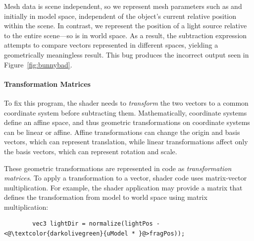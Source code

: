 \documentclass[../main.tex]{subfiles}
\begin{document}
	Mesh data is scene independent, so we represent mesh parameters such as  and  initially in model space, independent of the object's current relative position within the scene.
	In contrast, we represent the position of a light source relative to the entire scene---so  is in world space.
	As a result, the subtraction expression  attempts to compare vectors represented in different spaces, yielding a geometrically meaningless result.
	This bug produces the incorrect output seen in Figure~\ref{fig:bunnybad}.
	
	\paragraph {Transformation Matrices} To fix this program, the shader needs to \emph{transform} the two vectors to a common coordinate system before subtracting them. 
	Mathematically, coordinate systems define an affine space, and thus geometric transformations on coordinate systems can be linear or affine.
	Affine transformations can change the origin and basis vectors, which can represent translation, while linear transformations affect only the basis vectors, which can represent rotation and scale. 
	
	These geometric transformations are represented in code as \emph{transformation matrices}.
	To apply a transformation to a vector, shader code uses matrix-vector multiplication. 
	For example, the shader application may provide a matrix  that defines the transformation from model to world space using matrix multiplication:
	\begin{lstlisting}
		vec3 lightDir = normalize(lightPos - <@\textcolor{darkolivegreen}{uModel * }@>fragPos));
	\end{lstlisting}
	
\end{document}
